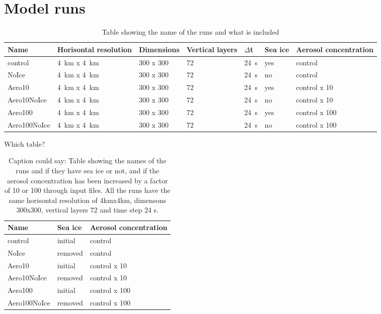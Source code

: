 \section{Model runs}
\begin{table}[H]
\centering
\caption{Table showing the name of the runs and what is included}
\label{tab:runs} 
\begin{tabular}{L{2.3cm} L{2.3cm} L{2cm} L{1.5cm} L{1cm} L{1cm} L{3cm}}
\centering
Name & Horisontal resolution & Dimensions & Vertical layers & $\Delta$t & Sea ice & Aerosol concentration\\ \hline
control & 4~km x 4~km & 300 x 300 & 72& 24~s & yes & control\\
NoIce & 4~km x 4~km & 300 x 300 & 72 & 24~s & no & control\\
Aero10 & 4~km x 4~km & 300 x 300 & 72 & 24~s & yes & control x 10\\
Aero10NoIce & 4~km x 4~km & 300 x 300 & 72 & 24~s & no & control x 10\\
Aero100 & 4~km x 4~km & 300 x 300 & 72 & 24~s & yes & control x 100\\
Aero100NoIce & 4~km x 4~km & 300 x 300 & 72 & 24~s & no & control x 100 \\
\end{tabular}
\end{table}

Which table?

\begin{table}[H]
\centering
\caption{Caption could say: Table showing the names of the runs and if they have sea ice or not, and if the aerosol concentration has been increased by a factor of 10 or 100 through input files. All the runs have the same horisontal resolution of 4kmx4km, dimensons 300x300, vertical layers 72 and time step 24 s.}
\label{tab:runs} 
\begin{tabular}{L{2.3cm} L{2cm} L{3cm}}
\centering
Name & Sea ice & Aerosol concentration\\ \hline
control & initial & control \\
NoIce & removed & control \\
Aero10 & initial & control x 10 \\
Aero10NoIce & removed & control x 10 \\
Aero100 & initial & control x 100 \\
Aero100NoIce & removed & control x 100 \\
\end{tabular}
\end{table}

